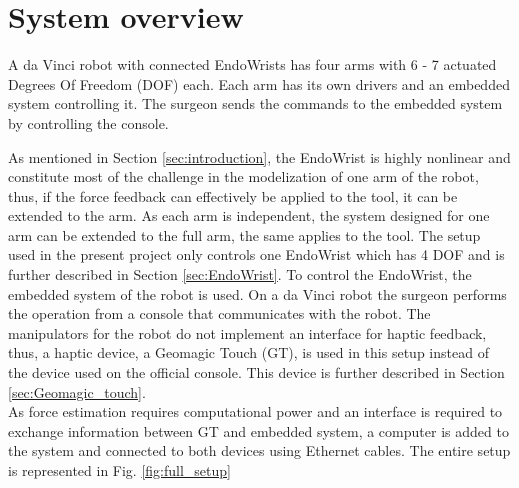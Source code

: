 \section{System overview}\label{sec:system_overview}
A da Vinci robot with connected EndoWrists has four arms with 6 - 7 actuated Degrees Of Freedom (DOF) each. Each arm has its own drivers and an embedded system controlling it. %
The surgeon sends the commands to the embedded system by controlling the console.

As mentioned in Section \ref{sec:introduction}, the EndoWrist is highly nonlinear and constitute most of the challenge in the modelization of one arm of the robot, thus, if the force feedback can effectively be applied to the tool, it can be extended to the arm. As each arm is independent, the system designed for one arm can be extended to the full arm, the same applies to the tool. The setup used in the present project only controls one EndoWrist which has 4 DOF and is further described in Section \ref{sec:EndoWrist}.%
 To control the EndoWrist, the embedded system of the robot is used. On a da Vinci robot the surgeon performs the operation from a console that communicates with the robot. The manipulators for the robot do not implement an interface for haptic feedback, thus, a haptic device, a Geomagic Touch (GT), is used in this setup instead of the device used on the official console. This device is further described in Section \ref{sec:Geomagic_touch}.\\
As force estimation requires computational power and an interface is required to exchange information between GT and embedded system, a computer is added to the system and connected to both devices using Ethernet cables. The entire setup is represented in Fig. \ref{fig:full_setup}
